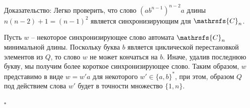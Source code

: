 \documentclass[11pt]{article}
\newcommand{\sw}{reset word}
\newcommand{\ssw}{reset word of minimum length}
\newenvironment{proof}{Доказательство:}{$\square$}
\begin{document}
\begin{proof}
Легко проверить, что слово $(ab^{n-1})^{n-2}a$ длины
$n(n-2)+1=(n-1)^2$ является синхронизирующим для $\mathrsfs{C}_n$.


Пусть $w$ -- некоторое синхронизирующее слово автомата $\mathrsfs{C}_n$ 
минимальной длины. Поскольку буква $b$ является циклической перестановкой
элементов из $Q$, то слово $w$ не может кончаться на $b$.
Иначе, удалив последнюю букву, мы получим более короткое синхронизирующее
слово. Таким образом, $w$ представимо в виде $w = w'a$ для некоторого $w'\in\{a,b\}^*$,
при этом, образом $Q$ под действием слова $w'$ будет в точности множество $\{1,n\}$.



\end{proof}
\end{document}

